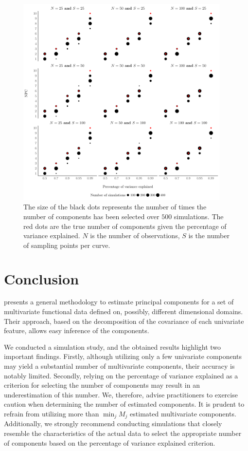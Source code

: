\begin{figure}
     \centering
    \includegraphics[width=0.95\textwidth]{figures/npc_estim.pdf}
    \caption{The size of the black dots represents the number of times the number of components has been selected over $500$ simulations. The red dots are the true number of components given the percentage of variance explained. $N$ is the number of observations, $S$ is the number of sampling points per curve.}
    \label{fig:npc_estim}
\end{figure}


\section{Conclusion} %
\label{sec:conclusion}

\cite{happMultivariateFunctionalPrincipal2018} presents a general methodology to estimate principal components for a set of multivariate functional data defined on, possibly, different dimensional domains. Their approach, based on the decomposition of the covariance of each univariate feature, allows easy inference of the components.

We conducted a simulation study, and the obtained results highlight two important findings. Firstly, although utilizing only a few univariate components may yield a substantial number of multivariate components, their accuracy is notably limited. Secondly, relying on the percentage of variance explained as a criterion for selecting the number of components may result in an underestimation of this number. We, therefore, advise practitioners to exercise caution when determining the number of estimated components. It is prudent to refrain from utilizing more than $\min_j M_j$ estimated multivariate components. Additionally, we strongly recommend conducting simulations that closely resemble the characteristics of the actual data to select the appropriate number of components based on the percentage of variance explained criterion.






